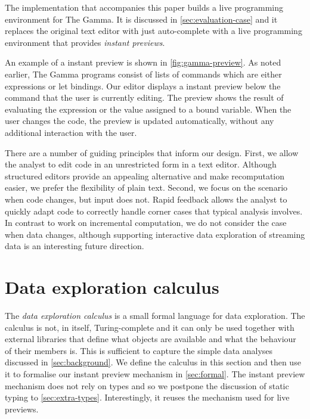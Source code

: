 \documentclass[english,crc,references=cleveref]{programming}
\theoremstyle{plain}
\theoremstyle{definition}
\begin{document}
The implementation that accompanies this paper builds a live programming environment for The Gamma.
It is discussed in \cref{sec:evaluation-case} and it replaces
the original text editor with just auto-complete with a live programming environment
that provides \emph{instant previews}.

An example of a instant preview is shown in \cref{fig:gamma-preview}. As noted earlier, The
Gamma programs consist of lists of commands which are either expressions or let bindings. Our
editor displays a instant preview below the command that the user is currently editing. The preview
shows the result of evaluating the expression or the value assigned to a bound variable. When the
user changes the code, the preview is updated automatically, without any additional interaction
with the user.

There are a number of guiding principles that inform our design. First, we allow the analyst
to edit code in an unrestricted form in a text editor. Although structured editors provide an
appealing alternative and make recomputation easier, we prefer the flexibility of plain text.
Second, we focus on the scenario when code changes, but input
does not. Rapid feedback allows the analyst to quickly adapt code to correctly handle
corner cases that typical analysis involves. In contrast to work on incremental computation,
we do not consider the case when data changes, although supporting interactive data exploration
of streaming data is an interesting future direction.


\section{Data exploration calculus}
\label{sec:calculus}

The \emph{data exploration calculus} is a small formal language for data exploration. The calculus
is not, in itself, Turing-complete and it can only be used together with external libraries that
define what objects are available and what the behaviour of their members is. This is
sufficient to capture the simple data analyses discussed in \cref{sec:background}. We
define the calculus in this section and then use it to formalise our instant preview
mechanism in \cref{sec:formal}.
%
The instant preview mechanism does not rely on types and so we postpone the discussion of static
typing to \cref{sec:extra-types}. Interestingly, it reuses the mechanism used for live
previews.
\end{document}
